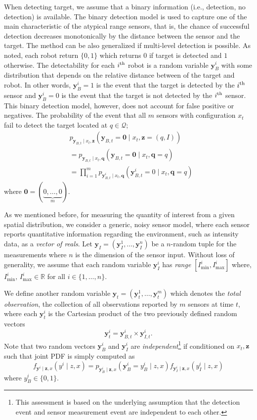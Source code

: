 \documentclass[journal]{IEEEtran}
\begin{document}
When detecting target, we assume that a binary information (i.e., detection, no detection) is available. The binary detection model is used to capture one of the main characteristic of the atypical range sensors, that is, the chance of successful detection decreases monotonically by the distance between the sensor and the target.
 The method can be also generalized if multi-level detection is possible.  As noted, each robot return $\lbrace 0,1 \rbrace$ which returns $0$ if target is detected and $1$ otherwise. The detectability for each $i^{\textup{th}}$ robot is a random variable $\bm{y}_B^i$ with some distribution that depends on the relative distance between of the target and robot. In other words, $\bm{y}_{B}^i=1$ is the event that the target is detected by the $i^{\textup{th}}$ sensor and $\bm{y}_{B}^i=0$ is the event that the target is not detected by the $i^{\textup{th}}$ sensor. This binary detection model, however, does not account for false positive or negatives.
The probability of the event that all $m$ sensors with configuration $x_t$ fail to detect the target located at $q \in \mathcal{Q}$;
\begin{align*}
&p_{\bm{y}_{B,t} \mid
	{x}_{t},\bm{z}}\left(
\bm{y}_{B,t} = \bm{0} \mid {x}_{t},
\bm{z}=(q,I)\right) \\
&=p_{\bm{y}_{B,t} \mid
	{x}_{t},\bm{q}}\left(
\bm{y}_{B,t} = \bm{0} \mid {x}_{t},
\bm{q}=q\right) \\
&= \prod_{i=1}^m
p_{\bm{y}_{B,t}^i \mid
	{x}_{t},\bm{q}}\left(
\bm{y}_{B,t}^i = 0 \mid
{x}_{t},\bm{q}=q\right)
\end{align*}
where $\bm{0}= (\underbrace{0,\dots,0}_{m})$.
 
As we mentioned before, for measuring the quantity of interest from a given spatial distribution, we consider a generic, noisy sensor model, where each sensor reports  quantitative information regarding the environment, such as intensity data, as a \emph{vector of reals}. Let $\bm{y}_I= (\bm{y}_I^1,\dots,\bm{y}_I^n)$ be a $n$-random tuple for the measurements where $n$ is the dimension of the sensor input. 
Without loss of generality, we assume that each random variable $\bm{y}_I^i$ has \emph{range} $[I_{\min}^i,I_{\max}^i]$ where, $I_{\min}^i,\,I_{\max}^i \in \mathbb{R}$ for all $i \in \lbrace 1,\dots,n \rbrace$.



We define another random variable $\bm{y}_t=(\bm{y}_t^1,\dots,\bm{y}_t^m)$ 
which denotes the \emph{total observation}, the collection of all observations reported by $m$ sensors at time $t$, where each $\bm{y}_t^i$ is the Cartesian product of the two previously defined random vectors
\[
\bm{y}_t^i = \bm{y}_{B,t}^i \times \bm{y}_{I,t}^i.
\]
Note that two random vectors $\bm{y}_B^i$ and $\bm{y}_I^i$ are \emph{independent}\footnote{This assessment is based on the underlying assumption that the detection event and sensor measurement event are independent to each other.} if conditioned on $x_t,\bm{z}$ such that joint PDF is simply
computed as
\[
f_{\bm{y}^i \mid \bm{z},x}(y^i \mid z,x) = p_{\bm{y}_B^i \mid \bm{z},x}(\bm{y}_B^i=y_B^i \mid z,x)f_{\bm{y}_I^i \mid \bm{z},x}(y_I^i \mid z,x)
\]
where $y_B^i \in \lbrace 0,1 \rbrace$.
\end{document}

